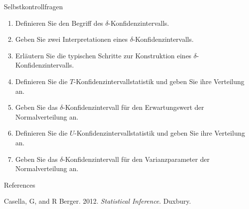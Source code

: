 \documentclass[
  8pt,
  ignorenonframetext,
]{beamer}
\providecommand{\tightlist}{%
  \setlength{\itemsep}{0pt}\setlength{\parskip}{0pt}}
\newlength{\cslhangindent}
\newlength{\cslentryspacingunit} %
\newenvironment{CSLReferences}[2] %
 {%
  \setlength{\parindent}{0pt}
  \ifodd #1
  \let\oldpar\par
  \def\par{\hangindent=\cslhangindent\oldpar}
  \fi
  \setlength{\parskip}{#2\cslentryspacingunit}
 }%
 {}
\begin{document}
\begin{frame}{Selbstkontrollfragen}
\protect\hypertarget{selbstkontrollfragen}{}
\small

\begin{enumerate}
\tightlist
\item
  Definieren Sie den Begriff des \(\delta\)-Konfidenzintervalls.
\item
  Geben Sie zwei Interpretationen eines \(\delta\)-Konfidenzintervalls.
\item
  Erläutern Sie die typischen Schritte zur Konstruktion eines
  \(\delta\)-Konfidenzintervalls.
\item
  Definieren Sie die \(T\)-Konfidenzintervallstatistik und geben Sie
  ihre Verteilung an.
\item
  Geben Sie das \(\delta\)-Konfidenzintervall für den Erwartungswert der
  Normalverteilung an.
\item
  Definieren Sie die \(U\)-Konfidenzintervallstatistik und geben Sie
  ihre Verteilung an.
\item
  Geben Sie das \(\delta\)-Konfidenzintervall für den Varianzparameter
  der Normalverteilung an.
\end{enumerate}
\end{frame}

\begin{frame}{References}
\protect\hypertarget{references}{}
\footnotesize

\hypertarget{refs}{}
\begin{CSLReferences}{1}{0}
\leavevmode{}%
Casella, G, and R Berger. 2012. \emph{Statistical {Inference}}.
{Duxbury}.

\end{CSLReferences}
\end{frame}
\end{document}
